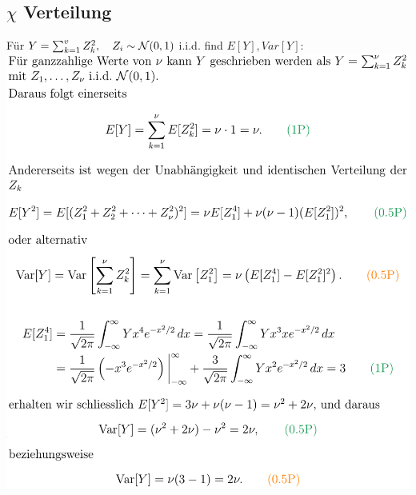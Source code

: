 \subsection{$\chi$ Verteilung}
Für $Y = \sum_{k=1}^v Z_k^2, \quad Z_i \sim \mathcal{N}(0,1)$ i.i.d. find $E[Y], Var[Y]$:
\\ \includegraphics[width=\linewidth]{./Figures/chi_verteilung.png}

